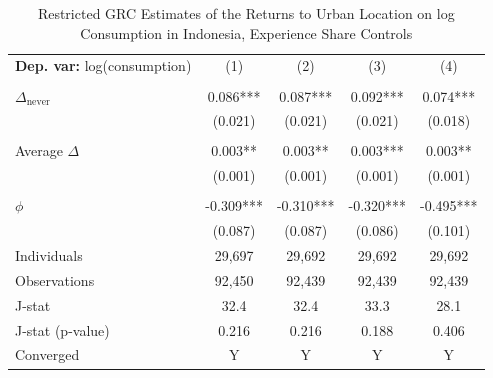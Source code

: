 \begin{table}[htbp] \centering \begin{threeparttable}
 \caption{Restricted GRC Estimates of the Returns to Urban Location on log Consumption in Indonesia, Experience Share Controls} 
 \label{tab:GRC_IDN_consumption_urban_unb_exp_sh} 
\begin{tabular}{l cccc} \toprule  \textbf{Dep. var:}  log(consumption) 
                    &\multicolumn{1}{c}{(1)}   &\multicolumn{1}{c}{(2)}   &\multicolumn{1}{c}{(3)}   &\multicolumn{1}{c}{(4)}   \\
                    &               &               &               &               \\
\addlinespace
$\Delta_{\text{never}}$&       0.086***&       0.087***&       0.092***&       0.074***\\
                    &     (0.021)   &     (0.021)   &     (0.021)   &     (0.018)   \\
                    &               &               &               &               \\
\addlinespace
Average $\Delta$    &       0.003** &       0.003** &       0.003***&       0.003** \\
                    &     (0.001)   &     (0.001)   &     (0.001)   &     (0.001)   \\
                    &               &               &               &               \\
\addlinespace
$\phi$              &      -0.309***&      -0.310***&      -0.320***&      -0.495***\\
                    &     (0.087)   &     (0.087)   &     (0.086)   &     (0.101)   \\
\addlinespace
Individuals         &      29,697   &      29,692   &      29,692   &      29,692   \\
Observations        &      92,450   &      92,439   &      92,439   &      92,439   \\
J-stat              &        32.4   &        32.4   &        33.3   &        28.1   \\
J-stat (p-value)    &       0.216   &       0.216   &       0.188   &       0.406   \\
Converged           &           Y   &           Y   &           Y   &           Y   \\

\end{tabular}
\end{threeparttable}
\end{table}
